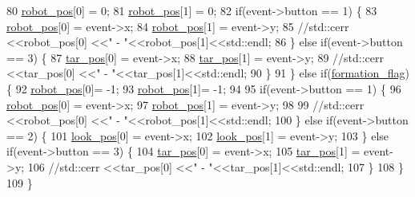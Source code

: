 \begin{DoxyCode}
80         \hyperlink{class_image_view_ab97c018602b91e96f318dc92af222aa5}{robot\_pos}[0] = 0;
81         \hyperlink{class_image_view_ab97c018602b91e96f318dc92af222aa5}{robot\_pos}[1] = 0;
82         \textcolor{keywordflow}{if}(event->button == 1) \{
83             \hyperlink{class_image_view_ab97c018602b91e96f318dc92af222aa5}{robot\_pos}[0] = \textcolor{keyword}{event}->x;
84             \hyperlink{class_image_view_ab97c018602b91e96f318dc92af222aa5}{robot\_pos}[1] = \textcolor{keyword}{event}->y;
85             \textcolor{comment}{//std::cerr <<robot\_pos[0] <<"  -  "<<robot\_pos[1]<<std::endl;}
86         \} \textcolor{keywordflow}{else} \textcolor{keywordflow}{if}(event->button == 3) \{
87             \hyperlink{class_image_view_a569238a3b9d094c11637673dba40bf29}{tar\_pos}[0] = \textcolor{keyword}{event}->x;
88             \hyperlink{class_image_view_a569238a3b9d094c11637673dba40bf29}{tar\_pos}[1] = \textcolor{keyword}{event}->y;
89             \textcolor{comment}{//std::cerr <<tar\_pos[0] <<"  -  "<<tar\_pos[1]<<std::endl;}
90         \}
91     \} \textcolor{keywordflow}{else} \textcolor{keywordflow}{if}(\hyperlink{class_image_view_a44427e978ef9239514b7149ebf59022c}{formation\_flag}) \{
92         \hyperlink{class_image_view_ab97c018602b91e96f318dc92af222aa5}{robot\_pos}[0]= -1;
93         \hyperlink{class_image_view_ab97c018602b91e96f318dc92af222aa5}{robot\_pos}[1]= -1;
94 
95         \textcolor{keywordflow}{if}(event->button == 1) \{
96             \hyperlink{class_image_view_ab97c018602b91e96f318dc92af222aa5}{robot\_pos}[0] = \textcolor{keyword}{event}->x;
97             \hyperlink{class_image_view_ab97c018602b91e96f318dc92af222aa5}{robot\_pos}[1] = \textcolor{keyword}{event}->y;
98 
99             \textcolor{comment}{//std::cerr <<robot\_pos[0] <<"  -  "<<robot\_pos[1]<<std::endl;}
100         \} \textcolor{keywordflow}{else} \textcolor{keywordflow}{if}(event->button == 2) \{
101             \hyperlink{class_image_view_af6562e3dfd03c0fb66826a7a5bd6e759}{look\_pos}[0] = \textcolor{keyword}{event}->x;
102             \hyperlink{class_image_view_af6562e3dfd03c0fb66826a7a5bd6e759}{look\_pos}[1] = \textcolor{keyword}{event}->y;
103         \} \textcolor{keywordflow}{else} \textcolor{keywordflow}{if}(event->button == 3) \{
104             \hyperlink{class_image_view_a569238a3b9d094c11637673dba40bf29}{tar\_pos}[0] = \textcolor{keyword}{event}->x;
105             \hyperlink{class_image_view_a569238a3b9d094c11637673dba40bf29}{tar\_pos}[1] = \textcolor{keyword}{event}->y;
106             \textcolor{comment}{//std::cerr <<tar\_pos[0] <<"  -  "<<tar\_pos[1]<<std::endl;}
107         \}
108     \}
109 \}
\end{DoxyCode}
\mbox{\label{class_image_view_a4a09cb2c02f13ca6ed325cc023634ff9}} 
